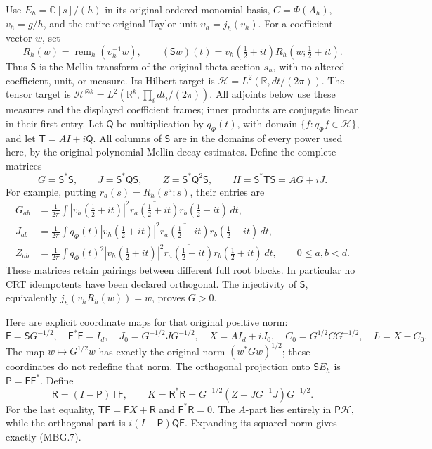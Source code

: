 Use \(E_h=\mathbb{C}[s]/(h)\) in its original ordered monomial basis,
\(C=\Phi(A_h)\), \(v_h=g/h\), and the entire original Taylor unit
\(\upsilon_h=j_h(v_h)\). For a coefficient vector \(w\), set
\[
 R_h(w)=\operatorname{rem}_h(\upsilon_h^{-1}w),\qquad
 (\mathsf S w)(t)=v_h(\tfrac12+it)R_h(w;\tfrac12+it).
 \tag{MBG.3}\label{eq:mbg-S}
\]
Thus \(\mathsf S\) is the Mellin transform of the original theta section
\(s_h\), with no altered coefficient, unit, or measure. Its Hilbert
target is \(\mathscr H=L^2(\mathbb{R},dt/(2\pi))\). The tensor target
is \(\mathscr H^{\otimes k}=L^2(\mathbb{R}^k,\prod_i dt_i/(2\pi))\).
All adjoints below use these measures and the displayed coefficient
frames; inner products are conjugate linear in their first entry.
Let \(\mathsf Q\) be multiplication by \(q_\Phi(t)\), with domain
\(\{f:q_\Phi f\in\mathscr H\}\), and let
\(\mathsf T=A I+i\mathsf Q\). All columns of \(\mathsf S\) are in
the domains of every power used here, by the original polynomial
Mellin decay estimates. Define the complete matrices
\[
 G=\mathsf S^*\mathsf S,\qquad
 J=\mathsf S^*\mathsf Q\mathsf S,\qquad
 Z=\mathsf S^*\mathsf Q^2\mathsf S,\qquad
 H=\mathsf S^*\mathsf T\mathsf S=A G+iJ.
 \tag{MBG.4}\label{eq:mbg-moments}
\]
For example, putting \(r_a(s)=R_h(s^a;s)\), their entries are
\[
 \begin{split}
 G_{ab}&=\frac1{2\pi}\int
   |v_h(\tfrac12+it)|^2\overline{r_a(\tfrac12+it)}r_b(\tfrac12+it)\,dt,\\
 J_{ab}&=\frac1{2\pi}\int q_\Phi(t)
   |v_h(\tfrac12+it)|^2\overline{r_a(\tfrac12+it)}r_b(\tfrac12+it)\,dt,\\
 Z_{ab}&=\frac1{2\pi}\int q_\Phi(t)^2
   |v_h(\tfrac12+it)|^2\overline{r_a(\tfrac12+it)}r_b(\tfrac12+it)\,dt,
 \qquad 0\le a,b<d .
 \end{split}
 \tag{MBG.5}\label{eq:mbg-all-entries}
\]
These matrices retain pairings between different full root blocks.
In particular no CRT idempotents have been declared orthogonal.
The injectivity of \(\mathsf S\), equivalently \(j_h(v_hR_h(w))=w\),
proves \(G>0\).

Here are explicit coordinate maps for that original positive norm:
\[
 \mathsf F=\mathsf S G^{-1/2},\quad \mathsf F^*\mathsf F=I_d,\quad
 J_0=G^{-1/2}JG^{-1/2},\quad X=A I_d+iJ_0,\quad
 C_0=G^{1/2}CG^{-1/2},\quad L=X-C_0.
 \tag{MBG.6}\label{eq:mbg-coordinates}
\]
The map \(w\mapsto G^{1/2}w\) has exactly the original norm
\((w^*Gw)^{1/2}\); these coordinates do not redefine that norm.
The orthogonal projection onto \(\mathsf S E_h\) is
\(\mathsf P=\mathsf F\mathsf F^*\). Define
\[
 \mathsf R=(I-\mathsf P)\mathsf T\mathsf F,\qquad
 K=\mathsf R^*\mathsf R
  =G^{-1/2}(Z-JG^{-1}J)G^{-1/2}.
 \tag{MBG.7}\label{eq:mbg-covariance}
\]
For the last equality, \(\mathsf T\mathsf F=\mathsf F X+\mathsf R\)
and \(\mathsf F^*\mathsf R=0\). The \(A\)-part lies entirely in
\(\mathsf P\mathscr H\), while the orthogonal part is
\(i(I-\mathsf P)\mathsf Q\mathsf F\). Expanding its squared norm
gives exactly (MBG.7).

